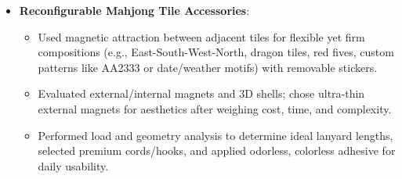 \documentclass{resume}
\begin{document}
{\begin{itemize}
{\begin{itemize}
\begin{itemize}
							\item \textbf{Implementation Details}: For the mod-based approach, combined invincibility, infinite resources, double jump, one-hit kill, and character swap mods. Designed short- and long-distance auto-travel plus branch-aware path planning. Leveraged invincibility to reduce dev difficulty, speed mods to cut wait times, and auto return-to-start to minimize user input.
						\end{itemize}
						
						\item \textbf{Reconfigurable Mahjong Tile Accessories}:
						\begin{itemize}
							\item Used magnetic attraction between adjacent tiles for flexible yet firm compositions (e.g., East-South-West-North, dragon tiles, red fives, custom patterns like AA2333 or date/weather motifs) with removable stickers.
							
							\item Evaluated external/internal magnets and 3D shells; chose ultra-thin external magnets for aesthetics after weighing cost, time, and complexity.
							
							\item Performed load and geometry analysis to determine ideal lanyard lengths, selected premium cords/hooks, and applied odorless, colorless adhesive for daily usability.
						\end{itemize}
					\end{itemize}
				}
				
			\end{itemize}%
		}{}%
		
\end{document}
